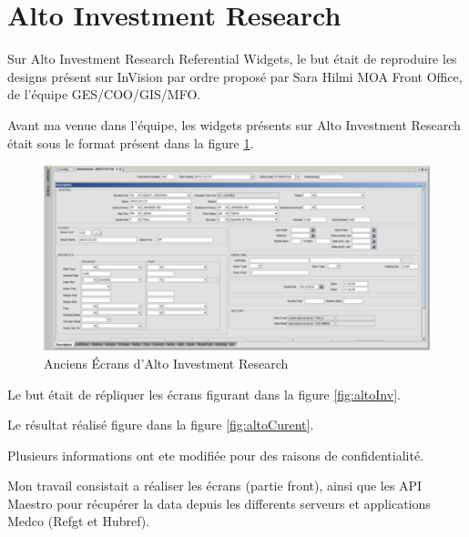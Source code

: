 \section{Alto Investment Research}
\par Sur Alto Investment Research Referential Widgets, le but était de reproduire les designs présent sur InVision par ordre proposé par Sara Hilmi MOA Front Office, de l'équipe GES/COO/GIS/MFO.
\par Avant ma venue dans l'équipe, les widgets présents sur Alto Investment Research était sous le format présent dans la figure \ref{fig:altoV1}.
\begin{figure}[ht]
    \centering
    \includegraphics[width=\columnwidth]{img/ancienecrans.png}
    \caption{Anciens Écrans d'Alto Investment Research}
    \label{fig:altoV1}
\end{figure} 
\par Le but était de répliquer les écrans figurant dans la figure \ref{fig:altoInv}.
\par Le résultat réalisé figure dans la figure \ref{fig:altoCurent}.
\par Plusieurs informations ont ete modifiée pour des raisons de confidentialité.
\par Mon travail consistait a réaliser les écrans (partie front), ainsi que les API Maestro pour récupérer la data depuis les differents serveurs et applications Medco (Refgt et Hubref).
